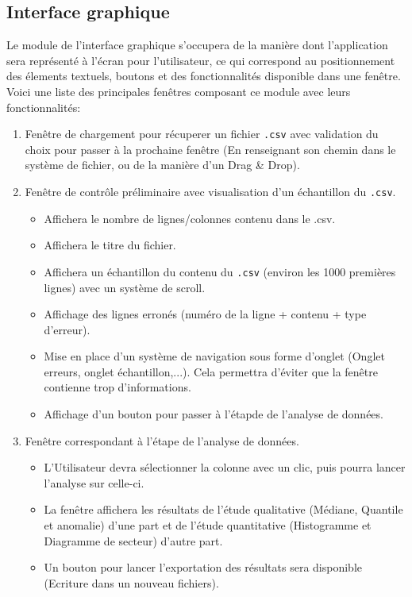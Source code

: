 		\subsection{Interface graphique}
			Le module de l'interface graphique s'occupera de la manière dont l'application sera représenté à l'écran pour l'utilisateur, ce qui correspond au positionnement des élements textuels, boutons et des fonctionnalités disponible dans une fenêtre. Voici une liste des principales fenêtres composant ce module avec leurs fonctionnalités:
			\begin{enumerate}
			\item Fenêtre de chargement pour récuperer un fichier \lstinline!.csv! avec validation du choix pour passer à la prochaine fenêtre (En renseignant son chemin dans le système de fichier, ou de la manière d'un Drag \& Drop).
			\item Fenêtre de contrôle préliminaire avec visualisation d'un échantillon du \lstinline!.csv!.		
				\begin{itemize}
				\item Affichera le nombre de lignes/colonnes contenu dans le .csv.
				\item Affichera le titre du fichier.
				\item Affichera un échantillon du contenu du \lstinline!.csv! (environ les 1000 premières lignes) avec un système de scroll.
				\item Affichage des lignes erronés (numéro de la ligne + contenu + type d'erreur).
				\item Mise en place d'un système de navigation sous forme d'onglet (Onglet erreurs, onglet échantillon,...). Cela permettra d'éviter que la fenêtre contienne trop d'informations.
				\item Affichage d'un bouton pour passer à l'étapde de l'analyse de données.
				\end{itemize}
			\item Fenêtre correspondant à l'étape de l'analyse de données.
				\begin{itemize}
				\item L'Utilisateur devra sélectionner la colonne avec un clic, puis pourra lancer l'analyse sur celle-ci.
				\item La fenêtre affichera les résultats de l'étude qualitative (Médiane, Quantile et anomalie) d'une part et de l'étude quantitative (Histogramme et Diagramme de secteur) d'autre part.
				\item Un bouton pour lancer l'exportation des résultats sera disponible (Ecriture dans un nouveau fichiers).
				\end{itemize}
			\end{enumerate}
		
